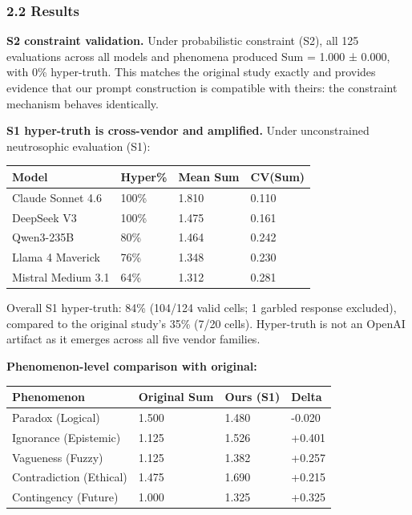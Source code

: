 \documentclass[
]{article}
\begin{document}
\hypertarget{results}{%
\subsubsection{2.2 Results}\label{results}}

\textbf{S2 constraint validation.} Under probabilistic constraint (S2),
all 125 evaluations across all models and phenomena produced Sum = 1.000
± 0.000, with 0\% hyper-truth. This matches the original study exactly
and provides evidence that our prompt construction is compatible with
theirs: the constraint mechanism behaves identically.

\textbf{S1 hyper-truth is cross-vendor and amplified.} Under
unconstrained neutrosophic evaluation (S1):

\begin{longtable}[]{@{}llll@{}}
\toprule\noalign{}
Model & Hyper\% & Mean Sum & CV(Sum) \\
\midrule\noalign{}
\endhead
\bottomrule\noalign{}
\endlastfoot
Claude Sonnet 4.6 & 100\% & 1.810 & 0.110 \\
DeepSeek V3 & 100\% & 1.475 & 0.161 \\
Qwen3-235B & 80\% & 1.464 & 0.242 \\
Llama 4 Maverick & 76\% & 1.348 & 0.230 \\
Mistral Medium 3.1 & 64\% & 1.312 & 0.281 \\
\end{longtable}

Overall S1 hyper-truth: 84\% (104/124 valid cells; 1 garbled response
excluded), compared to the original study's 35\% (7/20 cells).
Hyper-truth is not an OpenAI artifact as it emerges across all five
vendor families.

\textbf{Phenomenon-level comparison with original:}

\begin{longtable}[]{@{}llll@{}}
\toprule\noalign{}
Phenomenon & Original Sum & Ours (S1) & Delta \\
\midrule\noalign{}
\endhead
\bottomrule\noalign{}
\endlastfoot
Paradox (Logical) & 1.500 & 1.480 & -0.020 \\
Ignorance (Epistemic) & 1.125 & 1.526 & +0.401 \\
Vagueness (Fuzzy) & 1.125 & 1.382 & +0.257 \\
Contradiction (Ethical) & 1.475 & 1.690 & +0.215 \\
Contingency (Future) & 1.000 & 1.325 & +0.325 \\
\end{longtable}
\end{document}
